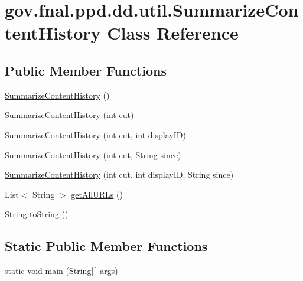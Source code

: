 \hypertarget{classgov_1_1fnal_1_1ppd_1_1dd_1_1util_1_1SummarizeContentHistory}{\section{gov.\-fnal.\-ppd.\-dd.\-util.\-Summarize\-Content\-History Class Reference}
\label{classgov_1_1fnal_1_1ppd_1_1dd_1_1util_1_1SummarizeContentHistory}
}
\subsection*{Public Member Functions}
\begin{DoxyCompactItemize}
\item 
\hyperlink{classgov_1_1fnal_1_1ppd_1_1dd_1_1util_1_1SummarizeContentHistory_a10ad8dba6a9efbdd66a84586bd12d6a0}{Summarize\-Content\-History} ()
\item 
\hyperlink{classgov_1_1fnal_1_1ppd_1_1dd_1_1util_1_1SummarizeContentHistory_a5f43324217aed65034807f5ce5b2e139}{Summarize\-Content\-History} (int cut)
\item 
\hyperlink{classgov_1_1fnal_1_1ppd_1_1dd_1_1util_1_1SummarizeContentHistory_ae671f3d8e29ddc2c90cb942d0ddcfa93}{Summarize\-Content\-History} (int cut, int display\-I\-D)
\item 
\hyperlink{classgov_1_1fnal_1_1ppd_1_1dd_1_1util_1_1SummarizeContentHistory_a5288f0ac3e16c1dca9cf1b9b34894038}{Summarize\-Content\-History} (int cut, String since)
\item 
\hyperlink{classgov_1_1fnal_1_1ppd_1_1dd_1_1util_1_1SummarizeContentHistory_aea18fd212882ca4d966340494e0c51d5}{Summarize\-Content\-History} (int cut, int display\-I\-D, String since)
\item 
List$<$ String $>$ \hyperlink{classgov_1_1fnal_1_1ppd_1_1dd_1_1util_1_1SummarizeContentHistory_a9522d14eff35263cd4a873903581671b}{get\-All\-U\-R\-Ls} ()
\item 
String \hyperlink{classgov_1_1fnal_1_1ppd_1_1dd_1_1util_1_1SummarizeContentHistory_ace26c8fd037dfa66a30cd4c07010e6b3}{to\-String} ()
\end{DoxyCompactItemize}
\subsection*{Static Public Member Functions}
\begin{DoxyCompactItemize}
\item 
static void \hyperlink{classgov_1_1fnal_1_1ppd_1_1dd_1_1util_1_1SummarizeContentHistory_a03a17880420f2f09c7a7d4e77956d827}{main} (String\mbox{[}$\,$\mbox{]} args)
\end{DoxyCompactItemize}


